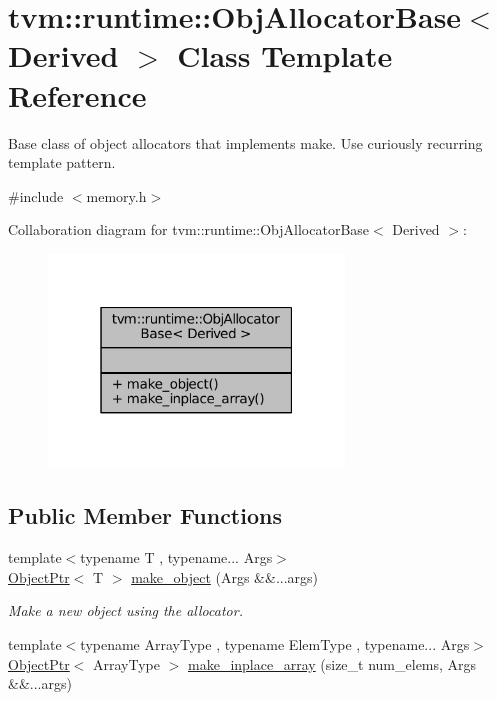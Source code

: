 \hypertarget{classtvm_1_1runtime_1_1ObjAllocatorBase}{}\section{tvm\+:\+:runtime\+:\+:Obj\+Allocator\+Base$<$ Derived $>$ Class Template Reference}
\label{classtvm_1_1runtime_1_1ObjAllocatorBase}


Base class of object allocators that implements make. Use curiously recurring template pattern.  




{\ttfamily \#include $<$memory.\+h$>$}



Collaboration diagram for tvm\+:\+:runtime\+:\+:Obj\+Allocator\+Base$<$ Derived $>$\+:
\nopagebreak
\begin{figure}[H]
\begin{center}
\leavevmode
\includegraphics[width=223pt]{classtvm_1_1runtime_1_1ObjAllocatorBase__coll__graph}
\end{center}
\end{figure}
\subsection*{Public Member Functions}
\begin{DoxyCompactItemize}
\item 
{\footnotesize template$<$typename T , typename... Args$>$ }\\\hyperlink{classtvm_1_1runtime_1_1ObjectPtr}{Object\+Ptr}$<$ T $>$ \hyperlink{classtvm_1_1runtime_1_1ObjAllocatorBase_ae42e75290cbdb2363f6391be2234c03b}{make\+\_\+object} (Args \&\&...args)
\begin{DoxyCompactList}\small\item\em Make a new object using the allocator. \end{DoxyCompactList}\item 
{\footnotesize template$<$typename Array\+Type , typename Elem\+Type , typename... Args$>$ }\\\hyperlink{classtvm_1_1runtime_1_1ObjectPtr}{Object\+Ptr}$<$ Array\+Type $>$ \hyperlink{classtvm_1_1runtime_1_1ObjAllocatorBase_a42e4146e6b03664deeb918948935c30c}{make\+\_\+inplace\+\_\+array} (size\+\_\+t num\+\_\+elems, Args \&\&...args)
\end{DoxyCompactItemize}


